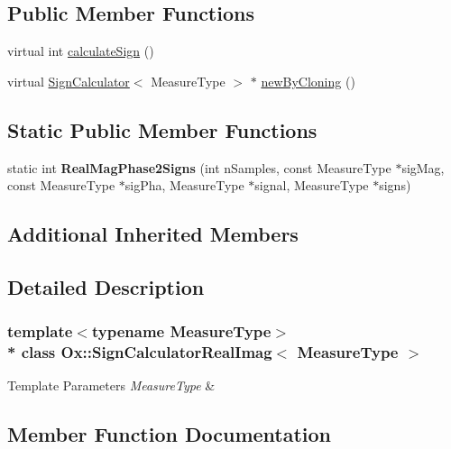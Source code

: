 \subsection*{Public Member Functions}
\begin{DoxyCompactItemize}
\item 
virtual int \hyperlink{class_ox_1_1_sign_calculator_real_imag_ae3f3c8f8e8ea994da7ad56f4a180cb36}{calculate\+Sign} ()
\item 
virtual \hyperlink{class_ox_1_1_sign_calculator}{Sign\+Calculator}$<$ Measure\+Type $>$ $\ast$ \hyperlink{class_ox_1_1_sign_calculator_real_imag_ae3340d1ac5728efcaf3d5a9299f01f2c}{new\+By\+Cloning} ()
\end{DoxyCompactItemize}
\subsection*{Static Public Member Functions}
\begin{DoxyCompactItemize}
\item 
static int {\bfseries Real\+Mag\+Phase2\+Signs} (int n\+Samples, const Measure\+Type $\ast$sig\+Mag, const Measure\+Type $\ast$sig\+Pha, Measure\+Type $\ast$signal, Measure\+Type $\ast$signs)\hypertarget{class_ox_1_1_sign_calculator_real_imag_a916a7be502489b814bd3b147075ae31d}{}\label{class_ox_1_1_sign_calculator_real_imag_a916a7be502489b814bd3b147075ae31d}

\end{DoxyCompactItemize}
\subsection*{Additional Inherited Members}


\subsection{Detailed Description}
\subsubsection*{template$<$typename Measure\+Type$>$\\*
class Ox\+::\+Sign\+Calculator\+Real\+Imag$<$ Measure\+Type $>$}


\begin{DoxyTemplParams}{Template Parameters}
{\em Measure\+Type} & \\
\hline
\end{DoxyTemplParams}


\subsection{Member Function Documentation}
